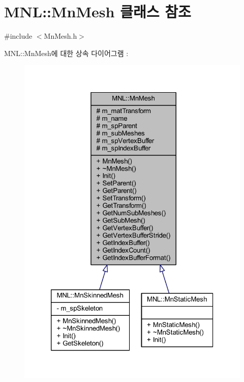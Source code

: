 \hypertarget{class_m_n_l_1_1_mn_mesh}{}\section{M\+NL\+:\+:Mn\+Mesh 클래스 참조}
\label{class_m_n_l_1_1_mn_mesh}


{\ttfamily \#include $<$Mn\+Mesh.\+h$>$}



M\+NL\+:\+:Mn\+Mesh에 대한 상속 다이어그램 \+: \nopagebreak
\begin{figure}[H]
\begin{center}
\leavevmode
\includegraphics[width=320pt]{class_m_n_l_1_1_mn_mesh__inherit__graph}
\end{center}
\end{figure}


